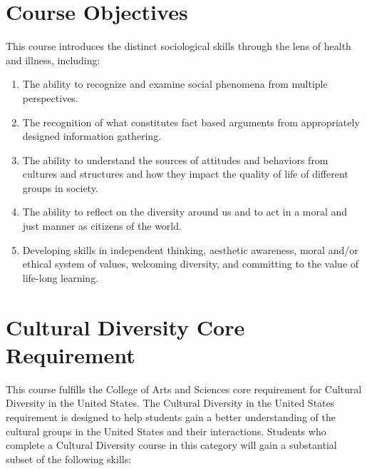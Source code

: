 \documentclass[]{book}
\begin{document}
\hypertarget{course-objectives}{%
\section{Course Objectives}\label{course-objectives}}

This course introduces the distinct sociological skills through the lens of health and illness, including:

\begin{enumerate}
\def\labelenumi{\arabic{enumi}.}
\item
  The ability to recognize and examine social phenomena from multiple perspectives.
\item
  The recognition of what constitutes fact based arguments from appropriately designed information gathering.
\item
  The ability to understand the sources of attitudes and behaviors from cultures and structures and how they impact the quality of life of different groups in society.
\item
  The ability to reflect on the diversity around us and to act in a moral and just manner as citizens of the world.
\item
  Developing skills in independent thinking, aesthetic awareness, moral and/or ethical system of values, welcoming diversity, and committing to the value of life-long learning.
\end{enumerate}

\hypertarget{cultural-diversity-core-requirement}{%
\section{Cultural Diversity Core Requirement}\label{cultural-diversity-core-requirement}}

This course fulfills the College of Arts and Sciences core requirement for Cultural Diversity in the United States. The Cultural Diversity in the United States requirement is designed to help students gain a better understanding of the cultural groups in the United States and their interactions. Students who complete a Cultural Diversity course in this category will gain a substantial subset of the following skills:
\end{document}
